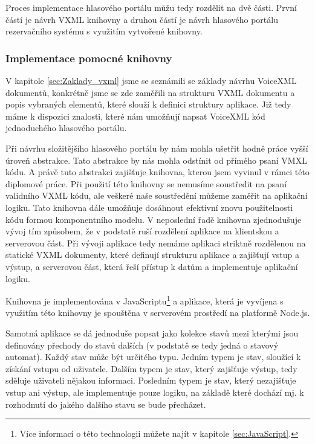\documentclass[ing,male,java,dept460]{diploma}						%
\begin{document}
Proces implementace hlasového portálu můžu tedy rozdělit na dvě části. První částí je návrh VXML knihovny a druhou částí je návrh hlasového portálu rezervačního systému s využitím vytvořené knihovny.

\subsubsection{Implementace pomocné knihovny}

V kapitole \ref{sec:Zaklady_vxml} jsme se seznámili se základy návrhu VoiceXML dokumentů, konkrétně jsme se zde zaměřili na strukturu VXML dokumentu a popis vybraných elementů, které slouží k definici struktury aplikace. Již tedy máme k dispozici znalosti, které nám umožňují napsat VoiceXML kód jednoduchého hlasového portálu.

Při návrhu složitějšího hlasového portálu by nám mohla ušetřit hodně práce vyšší úroveň abstrakce. Tato abstrakce by nás mohla odstínit od přímého psaní VMXL kódu. A právě tuto abstrakci zajišťuje knihovna, kterou jsem vyvinul v rámci této diplomové práce. Při použití této knihovny se nemusíme soustředit na psaní validního VXML kódu, ale veškeré naše soustředění můžeme zaměřit na aplikační logiku. Tato knihovna dále umožňuje dosáhnout efektivní znovu použitelnosti kódu formou komponentního modelu. V neposlední řadě knihovna zjednodušuje vývoj tím způsobem, že v podstatě ruší rozdělení aplikace na klientskou a serverovou část. Při vývoji aplikace tedy nemáme aplikaci striktně rozdělenou na statické VXML dokumenty, které definují strukturu aplikace a zajišťují vstup a výstup, a serverovou část, která řeší přístup k datům a implementuje aplikační logiku.

Knihovna je implementována v JavaScriptu\footnote{Více informací o této technologii můžete najít v kapitole \ref{sec:JavaScript}.} a aplikace, která je vyvíjena s využitím této knihovny je spouštěna v serverovém prostředí na platformě Node.js.

Samotná aplikace se dá jednoduše popsat jako kolekce stavů mezi kterými jsou definovány přechody do stavů dalších (v podstatě se tedy jedná o stavový automat). Každý stav může být určitého typu. Jedním typem je stav, sloužící k získání vstupu od uživatele. Dalším typem je stav, který zajišťuje výstup, tedy sděluje uživateli nějakou informaci. Posledním typem je stav, který nezajišťuje vstup ani výstup, ale implementuje pouze logiku, na základě které dochází mj. k rozhodnutí do jakého dalšího stavu se bude přecházet.
\end{document}
